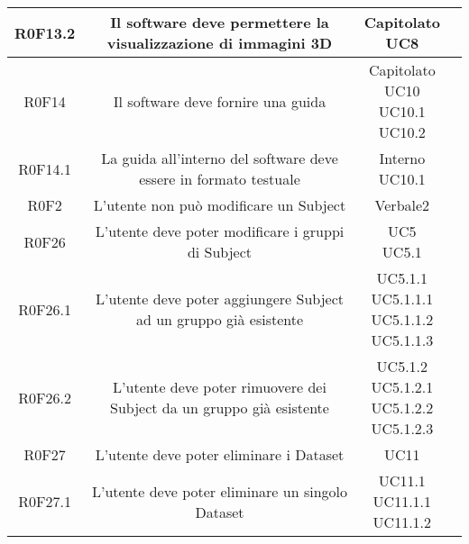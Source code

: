 \begin{center}
\begin{longtable}{|c|c|c|c|}
\hline
R0F13.2   & \parbox[t]{\larghezza}{Il software deve permettere la visualizzazione di immagini 3D}  & \parbox[t]{\dimFonti}{ Capitolato \\ UC8 \\} \\
\hline
R0F14   & \parbox[t]{\larghezza}{Il software deve fornire una guida}  & \parbox[t]{\dimFonti}{ Capitolato \\ UC10 \\ UC10.1 \\ UC10.2 \\} \\
\hline
R0F14.1   & \parbox[t]{\larghezza}{La guida all'interno del software deve essere in formato testuale}  & \parbox[t]{\dimFonti}{ Interno \\ UC10.1 \\} \\
\hline
R0F2   & \parbox[t]{\larghezza}{L'utente non può modificare un Subject\glossario{}}  & \parbox[t]{\dimFonti}{ Verbale2 \\} \\
\hline
R0F26   & \parbox[t]{\larghezza}{L'utente deve poter modificare i gruppi di Subject\glossario{}}  & \parbox[t]{\dimFonti}{ UC5 \\ UC5.1 \\} \\
\hline
R0F26.1   & \parbox[t]{\larghezza}{L'utente deve poter aggiungere Subject\glossario{} ad un gruppo già esistente}  & \parbox[t]{\dimFonti}{ UC5.1.1 \\ UC5.1.1.1 \\ UC5.1.1.2 \\ UC5.1.1.3 \\} \\
\hline
R0F26.2   & \parbox[t]{\larghezza}{L'utente deve poter rimuovere dei Subject\glossario{} da un gruppo già esistente}  & \parbox[t]{\dimFonti}{ UC5.1.2 \\ UC5.1.2.1 \\ UC5.1.2.2 \\ UC5.1.2.3 \\} \\
\hline
R0F27   & \parbox[t]{\larghezza}{L'utente deve poter eliminare i Dataset\glossario{}}  & \parbox[t]{\dimFonti}{ UC11 \\} \\
\hline
R0F27.1   & \parbox[t]{\larghezza}{L'utente deve poter eliminare un singolo Dataset\glossario{} }  & \parbox[t]{\dimFonti}{ UC11.1 \\ UC11.1.1 \\ UC11.1.2 \\} \\

\end{longtable}
\end{center}
